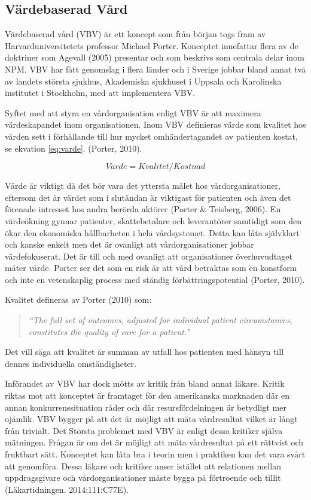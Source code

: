 \subsection{Värdebaserad Vård}

Värdebaserad vård (VBV) är ett koncept som från början togs fram av Harvarduniversitetets professor Michael Porter. Konceptet innefattar flera av de doktriner som Agevall (2005) presentar och som beskrivs som centrala delar inom NPM. VBV har fått genomslag i flera länder och i Sverige jobbar bland annat två av landets största sjukhus, Akademiska sjukhuset i Uppsala och Karolinska institutet i Stockholm, med att implementera VBV.
 
Syftet med att styra en vårdorganisation enligt VBV är att maximera värdeskapandet inom organisationen. Inom VBV definieras värde som kvalitet hos vården sett i förhållande till hur mycket omhändertagandet av patienten kostat, se ekvation \ref{eq:varde}. (Porter, 2010).

\begin{equation}
\label{eq:varde}
	V \ddot{a} rde = Kvalitet/Kostnad
\end{equation}

Värde är viktigt då det bör vara det yttersta målet hos vårdorganisationer, eftersom det är värdet som i slutändan är viktigast för patienten och även det förenade intresset hos andra berörda aktörer (Porter \& Teisberg, 2006). En värdeökning gynnar patienter, skattebetalare och leverantörer samtidigt som den ökar den ekonomiska hållbarheten i hela vårdsystemet. Detta kan låta självklart och kanske enkelt men det är ovanligt att vårdorganisationer jobbar värdefokuserat. Det är till och med ovanligt att organisationer överhuvudtaget mäter värde. Porter ser det som en risk är att vård betraktas som en konstform och inte en vetenskaplig process med ständig förbättringspotential (Porter, 2010).
 
Kvalitet defineras av Porter (2010) som:
\begin{quotation}
\textit{``The full set of outcomes, adjusted for individual patient circumstances, constitutes the quality of care for a patient.''}
\end{quotation}
Det vill säga att kvalitet är summan av utfall hos patienten med hänsyn till dennes individuella omständigheter.

Införandet av VBV har dock mötts av kritik från bland annat läkare. Kritik riktas mot att konceptet är framtaget för den amerikanska marknaden där en annan konkurrenssituation råder och där resursfördelningen är betydligt mer ojämlik. VBV bygger på att det är möjligt att mäta vårdresultat vilket är långt från trivialt. Det Största problemet med VBV är enligt dessa kritiker själva mätningen. Frågan är om det är möjligt att mäta vårdresultat på ett rättvist och fruktbart sätt. Konceptet kan låta bra i teorin men i praktiken kan det vara svårt att genomföra. Dessa läkare och kritiker anser istället att relationen mellan uppdragsgivare och vårdorganisationer måste bygga på förtroende och tillit (Läkartidningen. 2014;111:C77E). 

